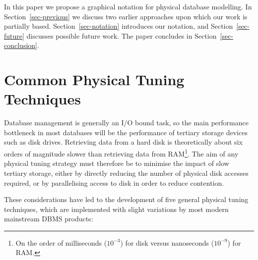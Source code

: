 \documentclass{CRPITStyle}
\begin{document}
In this paper we propose a graphical notation for physical database
modelling. In Section~\ref{sec-previous} we discuss two earlier
approaches upon which our work is partially based.
Section~\ref{sec-notation} introduces our notation, and
Section~\ref{sec-future} discusses possible future work. The paper
concludes in Section~\ref{sec-conclusion}.


\section{Common Physical Tuning Techniques}
\label{sec-techniques}

Database management is generally an I/O bound task, so the main
performance bottleneck in most databases will be the performance of
tertiary storage devices such as disk drives. Retrieving data from a
hard disk is theoretically about six orders of magnitude slower than
retrieving data from RAM\footnote{On the order of milliseconds
(\(10^{-3}\)) for disk versus nanoseconds (\(10^{-9}\)) for RAM.}. The
aim of any physical tuning strategy must therefore be to minimise the
impact of slow tertiary storage, either by directly reducing the number
of physical disk accesses required, or by parallelising access to disk
in order to reduce contention.

These considerations have led to the development of five general
physical tuning techniques, which are implemented with slight variations
by most modern mainstream DBMS products:
\end{document}
